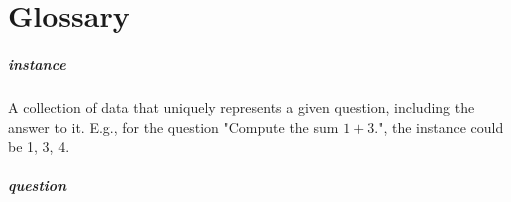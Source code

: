 \documentclass[
  digital, %
  table,   %
  twoside, %
  nolof,     %
  nolot,     %
  draft=false,
  final,
]{fithesis3}
\begin{document}
\chapter{Glossary}


\paragraph{instance}

A collection of data that uniquely represents a given question, including the answer to it. E.g., for the question "Compute the sum $1 + 3$.", the instance could be 1, 3, 4.

\paragraph{question}

\appendix


\end{document}
